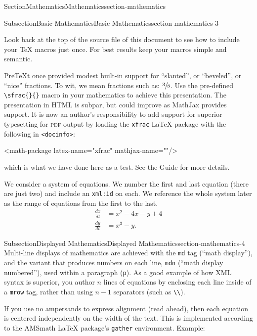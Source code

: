 \documentclass[twoside,10pt,]{article}
\newcommand{\mono}[1]{\texttt{#1}}
\newcommand{\initialism}[1]{\textsc{\MakeLowercase{#1}}}
\numberwithin{equation}{section}
\newcommand{\amp}{&}
\begin{document}
\begin{sectionptx}{Section}{Mathematics}{}{Mathematics}{}{}{section-mathematics}
\begin{subsectionptx}{Subsection}{Basic Mathematics}{}{Basic Mathematics}{}{}{section-mathematics-3}
%
\par
Look back at the top of the source file of this document to see how to include your \TeX{} macros just once.  For best results keep your macros simple and semantic.%
\par
PreTeXt once provided modest built-in support for ``slanted'', or ``beveled'', or ``nice'' fractions.  To wit, we mean fractions such as: \(\sfrac{3}{8}\).  Use the pre-defined \mono{\textbackslash{}sfrac\{\}\{\}} macro in your mathematics to achieve this presentation.  The presentation in HTML is subpar, but could improve as MathJax provides support.  It is now an author's responsibility to add support for superior typesetting for \initialism{PDF} output by loading the \mono{xfrac} \LaTeX{} package with the following in \mono{<docinfo>}:%
\begin{codedisplay}
<math-package latex-name="xfrac" mathjax-name=""/>
\end{codedisplay}
which is what we have done here as a test.  See the Guide for more details.%
\par
We consider a system of equations.  We number the first and last equation (there are just two) and include an \mono{xml:id} on each.  We reference the whole system later as the range of equations from the first to the last.%
\begin{align}
\frac{dx}{dt} \amp = x^2 - 4x - y + 4\label{equation-system-begin}\\
\frac{dy}{dt} \amp = x^3 - y.\label{equation-system-end}
\end{align}
%
\end{subsectionptx}
%
%
\typeout{************************************************}
\typeout{************************************************}
%
\begin{subsectionptx}{Subsection}{Displayed Mathematics}{}{Displayed Mathematics}{}{}{section-mathematics-4}
Multi-line displays of mathematics are achieved with the \mono{md} tag (``math display''), and the variant that produces numbers on each line, \mono{mdn} (``math display numbered''), used within a paragraph (\mono{p}).  As a good example of how XML syntax is superior, you author \(n\) lines of equations by enclosing each line inside of a \mono{mrow} tag, rather than using \(n-1\) separators (such as \mono{\textbackslash{}\textbackslash{}}).%
\par
If you use no ampersands to express alignment (read ahead), then each equation is centered independently on the width of the text.  This is implemented according to the AMSmath \LaTeX{} package's \mono{gather} environment.  Example:%

\end{subsectionptx}
\end{sectionptx}
\end{document}
